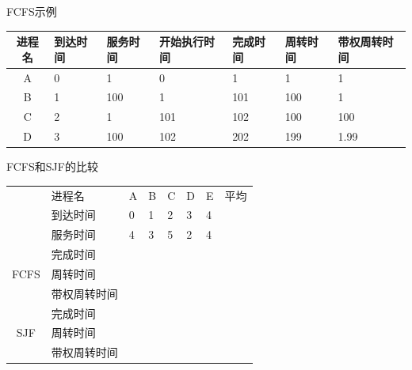 \begin{frame}[fragile]{FCFS示例}
  \begin{tabular}{|c|p{28pt}|p{28pt}|p{36pt}|p{28pt}|p{28pt}|p{36pt}|}  
    \hline \rowcolor{yellow!30}
    进程名 & 到达时间 & 服务时间 & 开始执行时间 & 完成时间 & 周转时间 & 带权周转时间 \\ \hline
    A & 0 & 1 & 0 & 1 & 1 & 1 \\ \hline
    B & 1 & 100 & 1 & 101 & 100 & 1\\ \hline
    C & 2 & 1 & 101 & 102 & 100 & 100\\ \hline
    D & 3 & 100 & 102 & 202 & 199 & 1.99\\ \hline
  \end{tabular}
\end{frame}


\begin{frame}[fragile]{FCFS和SJF的比较}
  \begin{tabular}{|c|l|p{0.8cm}|p{0.8cm}|p{0.8cm}|p{0.8cm}|p{0.8cm}|c|}
    \hline
    \multirow{3}{*}{} & 进程名 & A & B & C & D & E & 平均 \\ \cline{2-8}
    & 到达时间 & 0 & 1 & 2 & 3 & 4 & \\ \cline{2-7}
    & 服务时间 & 4 & 3 & 5 & 2 & 4 & \\ \hline \hline

    \multirow{3}{*}{FCFS} & 完成时间 & ~ &  &  &  &  &  \\ \cline{2-8}
    & 周转时间 &  &  &  &  &  &  \\ \cline{2-8}
    & 带权周转时间 &  &  &  &  &  &  \\ \hline \hline

    \multirow{3}{*}{SJF} & 完成时间 &  &  &  &  &  &  \\ \cline{2-8}
    & 周转时间 &  &  &  &  &   &  \\ \cline{2-8}
    & 带权周转时间 &  &  &  &  &  &  \\ \hline
  \end{tabular}
\end{frame}


